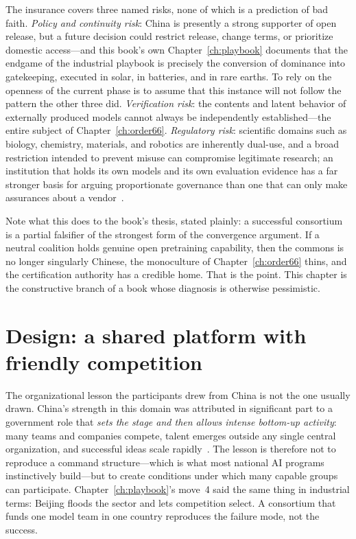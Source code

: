 The insurance covers three named risks, none of which is a prediction of bad faith. \emph{Policy and continuity risk}: China is presently a strong supporter of open release, but a future decision could restrict release, change terms, or prioritize domestic access---and this book's own Chapter~\ref{ch:playbook} documents that the endgame of the industrial playbook is precisely the conversion of dominance into gatekeeping, executed in solar, in batteries, and in rare earths. To rely on the openness of the current phase is to assume that this instance will not follow the pattern the other three did. \emph{Verification risk}: the contents and latent behavior of externally produced models cannot always be independently established---the entire subject of Chapter~\ref{ch:order66}. \emph{Regulatory risk}: scientific domains such as biology, chemistry, materials, and robotics are inherently dual-use, and a broad restriction intended to prevent misuse can compromise legitimate research; an institution that holds its own models and its own evaluation evidence has a far stronger basis for arguing proportionate governance than one that can only make assurances about a vendor~\cite{consortium-record}.

Note what this does to the book's thesis, stated plainly: a successful consortium is a partial falsifier of the strongest form of the convergence argument. If a neutral coalition holds genuine open pretraining capability, then the commons is no longer singularly Chinese, the monoculture of Chapter~\ref{ch:order66} thins, and the certification authority has a credible home. That is the point. This chapter is the constructive branch of a book whose diagnosis is otherwise pessimistic.

\section{Design: a shared platform with friendly competition}

The organizational lesson the participants drew from China is not the one usually drawn. China's strength in this domain was attributed in significant part to a government role that \emph{sets the stage and then allows intense bottom-up activity}: many teams and companies compete, talent emerges outside any single central organization, and successful ideas scale rapidly~\cite{consortium-record}. The lesson is therefore not to reproduce a command structure---which is what most national AI programs instinctively build---but to create conditions under which many capable groups can participate. Chapter~\ref{ch:playbook}'s move~4 said the same thing in industrial terms: Beijing floods the sector and lets competition select. A consortium that funds one model team in one country reproduces the failure mode, not the success.

